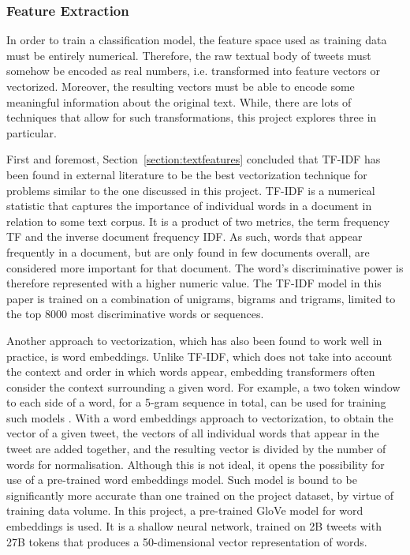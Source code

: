 \documentclass[a4paper,12pt]{article}
\begin{document}
\subsubsection{Feature Extraction}
In order to train a classification model, the feature space used as training data must be entirely numerical. Therefore, the raw textual body of tweets must somehow be encoded as real numbers, i.e. transformed into feature vectors or vectorized. Moreover, the resulting vectors must be able to encode some meaningful information about the original text. While, there are lots of techniques that allow for such transformations, this project explores three in particular.

First and foremost, Section~\ref{section:textfeatures} concluded that TF-IDF has been found in external literature to be the best vectorization technique for problems similar to the one discussed in this project. TF-IDF is a numerical statistic that captures the importance of individual words in a document in relation to some text corpus. It is a product of two metrics, the term frequency TF and the inverse document frequency IDF. As such, words that appear frequently in a document, but are only found in few documents overall, are considered more important for that document. The word's discriminative power is therefore represented with a higher numeric value. The TF-IDF model in this paper is trained on a combination of unigrams, bigrams and trigrams, limited to the top 8000 most discriminative words or sequences.

Another approach to vectorization, which has also been found to work well in practice, is word embeddings. Unlike TF-IDF, which does not take into account the context and order in which words appear, embedding transformers often consider the context surrounding a given word. For example, a two token window to each side of a word, for a 5-gram sequence in total, can be used for training such models \cite{levy-goldberg-2014-linguistic}.
With a word embeddings approach to vectorization, to obtain the vector of a given tweet, the vectors of all individual words that appear in the tweet are added together, and the resulting vector is divided by the number of words for normalisation. Although this is not ideal, it opens the possibility for use of a pre-trained word embeddings model. Such model is bound to be significantly more accurate than one trained on the project dataset, by virtue of training data volume. In this project, a pre-trained GloVe \cite{pennington2014glove} model for word embeddings is used. It is a shallow neural network, trained on 2B tweets with 27B tokens that produces a 50-dimensional vector representation of words.
\end{document}
